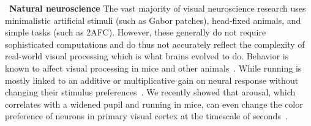 \documentclass[COG,11pt]{ercgrant}
\begin{document}

~\textbf{Natural neuroscience} The vast majority of visual neuroscience research uses minimalistic artificial stimuli (such as Gabor patches), head-fixed animals, and simple tasks (such as 2AFC).
However, these generally do not require sophisticated computations and do thus not accurately reflect the complexity of real-world visual processing which is what brains evolved to do.
Behavior is known to affect visual processing in mice and other animals~\parencite{Niell2010-bs, Musall2019-kd, Erisken2014-un,Christensen2017-bx}. 
While running is mostly linked to an additive or multiplicative gain on neural response without changing their stimulus preferences~\parencite{Dadarlat2017-jw, Mineault2016-fk}.
We recently showed that arousal, which correlates with a widened pupil and running in mice, can even change the color preference of neurons in primary visual cortex at the timescale of seconds~\parencite{Franke2022-do}. 

\end{document}
